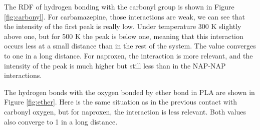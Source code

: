 The RDF of hydrogen bonding with the carbonyl group is shown in Figure \ref{fig:carbonyl}. For carbamazepine, those interactions are weak, we can see that the intensity of the first peak is really low. Under temperature 300 K slightly above one, but for 500 K the peak is below one, meaning that this interaction occurs less at a small distance than in the rest of the system. The value converges to one in a long distance. For naproxen, the interaction is more relevant, and the intensity of the peak is much higher but still less than in the NAP-NAP interactions.

The hydrogen bonds with the oxygen bonded by ether bond in PLA are shown in Figure \ref{fig:ether}. Here is the same situation as in the previous contact with carbonyl oxygen, but for naproxen, the interaction is less relevant. Both values also converge to 1 in a long distance.
\newpage
